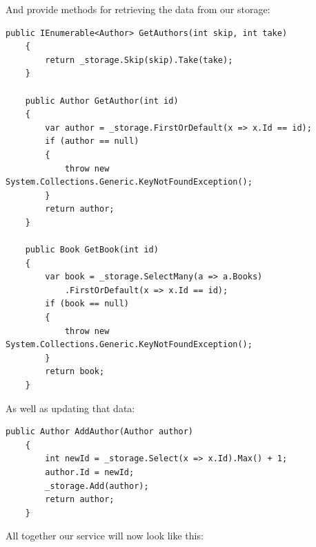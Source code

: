 And provide methods for retrieving the data from our storage:

\begin{lstlisting}
public IEnumerable<Author> GetAuthors(int skip, int take)
    {
        return _storage.Skip(skip).Take(take);
    }

    public Author GetAuthor(int id)
    {
        var author = _storage.FirstOrDefault(x => x.Id == id);
        if (author == null)
        {
            throw new System.Collections.Generic.KeyNotFoundException();
        }
        return author;
    }

    public Book GetBook(int id)
    {
        var book = _storage.SelectMany(a => a.Books)
            .FirstOrDefault(x => x.Id == id);
        if (book == null)
        {
            throw new System.Collections.Generic.KeyNotFoundException();
        }
        return book;
    }
\end{lstlisting}

As well as updating that data:


\begin{lstlisting}
public Author AddAuthor(Author author)
    {
        int newId = _storage.Select(x => x.Id).Max() + 1;
        author.Id = newId;
        _storage.Add(author);
        return author;
    }
\end{lstlisting}

All together our service will now look like this:

